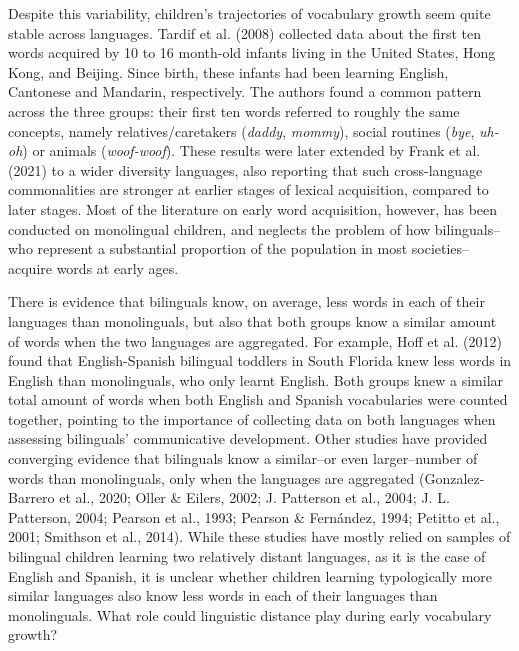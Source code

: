 \documentclass[
  letterpaper,
  DIV=11,
  numbers=noendperiod]{scrartcl}
\begin{document}
Despite this variability, children's trajectories of vocabulary growth
seem quite stable across languages. Tardif et al. (2008) collected data
about the first ten words acquired by 10 to 16 month-old infants living
in the United States, Hong Kong, and Beijing. Since birth, these infants
had been learning English, Cantonese and Mandarin, respectively. The
authors found a common pattern across the three groups: their first ten
words referred to roughly the same concepts, namely relatives/caretakers
(\emph{daddy}, \emph{mommy}), social routines (\emph{bye}, \emph{uh-oh})
or animals (\emph{woof-woof}). These results were later extended by
Frank et al. (2021) to a wider diversity languages, also reporting that
such cross-language commonalities are stronger at earlier stages of
lexical acquisition, compared to later stages. Most of the literature on
early word acquisition, however, has been conducted on monolingual
children, and neglects the problem of how bilinguals--who represent a
substantial proportion of the population in most societies--acquire
words at early ages.

There is evidence that bilinguals know, on average, less words in each
of their languages than monolinguals, but also that both groups know a
similar amount of words when the two languages are aggregated. For
example, Hoff et al. (2012) found that English-Spanish bilingual
toddlers in South Florida knew less words in English than monolinguals,
who only learnt English. Both groups knew a similar total amount of
words when both English and Spanish vocabularies were counted together,
pointing to the importance of collecting data on both languages when
assessing bilinguals' communicative development. Other studies have
provided converging evidence that bilinguals know a similar--or even
larger--number of words than monolinguals, only when the languages are
aggregated (Gonzalez-Barrero et al., 2020; Oller \& Eilers, 2002; J.
Patterson et al., 2004; J. L. Patterson, 2004; Pearson et al., 1993;
Pearson \& Fernández, 1994; Petitto et al., 2001; Smithson et al.,
2014). While these studies have mostly relied on samples of bilingual
children learning two relatively distant languages, as it is the case of
English and Spanish, it is unclear whether children learning
typologically more similar languages also know less words in each of
their languages than monolinguals. What role could linguistic distance
play during early vocabulary growth?
\end{document}
